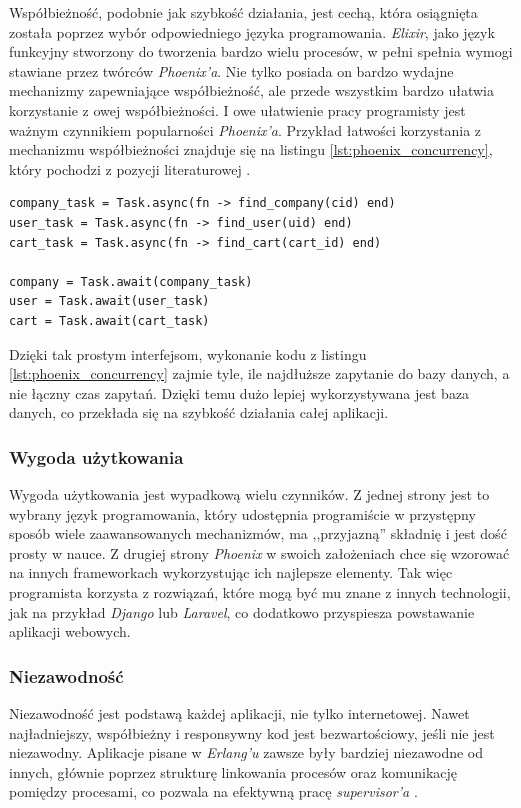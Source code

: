 Współbieżność, podobnie jak szybkość działania, jest cechą, która osiągnięta została poprzez wybór odpowiedniego języka programowania. \textit{Elixir}, jako język funkcyjny stworzony do tworzenia bardzo wielu procesów, w pełni spełnia wymogi stawiane przez twórców \textit{Phoenix'a}. Nie tylko posiada on bardzo wydajne mechanizmy zapewniające współbieżność, ale przede wszystkim bardzo ułatwia korzystanie z owej współbieżności. I owe ułatwienie pracy programisty jest ważnym czynnikiem popularności \textit{Phoenix'a}. Przykład łatwości korzystania z mechanizmu współbieżności znajduje się na listingu \ref{lst:phoenix_concurrency}, który pochodzi z pozycji literaturowej \cite{phoenix_doctrine}.

\begin{lstlisting}[label={lst:phoenix_concurrency}, caption=Współbieżność w Phoenix'ie]
company_task = Task.async(fn -> find_company(cid) end)
user_task = Task.async(fn -> find_user(uid) end)
cart_task = Task.async(fn -> find_cart(cart_id) end)

company = Task.await(company_task)
user = Task.await(user_task)
cart = Task.await(cart_task)
\end{lstlisting}

Dzięki tak prostym interfejsom, wykonanie kodu z listingu \ref{lst:phoenix_concurrency} zajmie tyle, ile najdłuższe zapytanie do bazy danych, a nie łączny czas zapytań. Dzięki temu dużo lepiej wykorzystywana jest baza danych, co przekłada się na szybkość działania całej aplikacji.

\subsubsection{Wygoda użytkowania}
Wygoda użytkowania jest wypadkową wielu czynników. Z jednej strony jest to wybrany język programowania, który udostępnia programiście w przystępny sposób wiele zaawansowanych mechanizmów, ma ,,przyjazną'' składnię i jest dość prosty w nauce. Z drugiej strony \textit{Phoenix} w swoich założeniach chce się wzorować na innych frameworkach wykorzystując ich najlepsze elementy. Tak więc programista korzysta z rozwiązań, które mogą być mu znane z innych technologii, jak na przykład \textit{Django} lub \textit{Laravel}, co dodatkowo przyspiesza powstawanie aplikacji webowych.

\subsubsection{Niezawodność}
Niezawodność jest podstawą każdej aplikacji, nie tylko internetowej. Nawet najładniejszy, współbieżny i responsywny kod jest bezwartościowy, jeśli nie jest niezawodny. Aplikacje pisane w \textit{Erlang'u} zawsze były bardziej niezawodne od innych, głównie poprzez strukturę linkowania procesów oraz komunikację pomiędzy procesami, co pozwala na efektywną pracę \textit{supervisor'a} \cite{phoenix_doctrine}.


